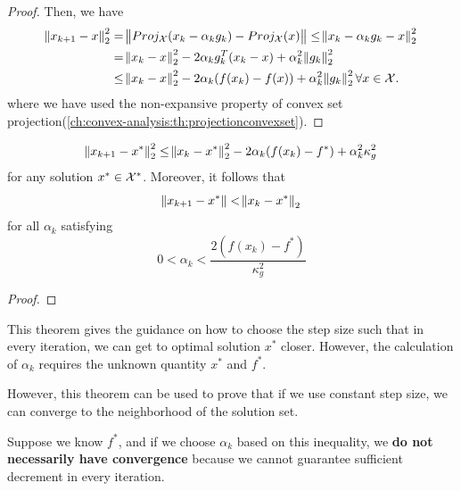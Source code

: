 \begin{refsection}
\begin{proof}
Then, we have
\begin{align*}
\norm{x_{k+1}-x}_2^2 &= \norm{Proj_{\mathcal{X}}(x_k - \alpha_kg_k) - Proj_{\mathcal{X}}(x)} \leq \norm{x_k - \alpha_k g_k - x}_2^2 \\
&= \norm{x_k - x}_2^2 - 2\alpha_kg_k^T(x_k-x) + \alpha_k^2\norm{g_k}_2^2\\
&\leq \norm{x_k - x}_2^2 - 2\alpha_k(f(x_k) - f(x)) + \alpha_k^2\norm{g_k}_2^2 \forall x\in \mathcal{X}.
\end{align*}
where we have used the non-expansive property of convex set projection(\autoref{ch:convex-analysis:th:projectionconvexset}). 
\end{proof}


\begin{lemma}\label{ch:convex-optimization:th:fundamentalinequalitysubgradientmethodboundedsubgradient}
$$\norm{x_{k+1} - x^*}_2^2\leq \norm{x_k - x^*}_2^2 - 2\alpha_k (f(x_k) - f^*) + \alpha_k^2 \kappa_g^2$$
for any solution $x^*\in \mathcal{X}^*$. Moreover, it follows that
$$\norm{x_{k+1} - x^*} < \norm{x_k - x^*}_2$$
for all $\alpha_k$ satisfying
$$0 < \alpha_k < \frac{2(f(x_k) - f^*)}{\kappa_g^2}$$
\end{lemma}
\begin{proof}
	
\end{proof}

\begin{remark}
This theorem gives the guidance on how to choose the step size such that in every iteration, we can get to optimal solution $x^*$ closer. However, the calculation of $\alpha_k$ requires the unknown quantity $x^*$ and $f^*$.

However, this theorem can be used to prove that if we use constant step size, we can converge to the neighborhood of the solution set.

Suppose we know $f^*$, and if we choose $\alpha_k$ based on this inequality, we \textbf{do not necessarily have convergence} because we cannot guarantee sufficient decrement in every iteration.
\end{remark}


\end{refsection}
